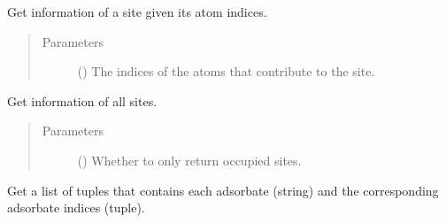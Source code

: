 \documentclass[letterpaper,10pt,english]{sphinxmanual}
\begin{document}
\begin{fulllineitems}
\begin{fulllineitems}
\label{\detokenize{modules:acat.adsorbate_coverage.ClusterAdsorbateCoverage.get_site}}
Get information of a site given its atom indices.
\begin{quote}\begin{description}
\item[{Parameters}] \leavevmode
{} () \textendash{} The indices of the atoms that contribute to the site.

\end{description}\end{quote}

\end{fulllineitems}


\begin{fulllineitems}
\label{\detokenize{modules:acat.adsorbate_coverage.ClusterAdsorbateCoverage.get_sites}}
Get information of all sites.
\begin{quote}\begin{description}
\item[{Parameters}] \leavevmode
{} (\sphinxstyleliteralemphasis{\sphinxupquote{, }}) \textendash{} Whether to only return occupied sites.

\end{description}\end{quote}

\end{fulllineitems}


\begin{fulllineitems}
\label{\detokenize{modules:acat.adsorbate_coverage.ClusterAdsorbateCoverage.get_adsorbates}}
Get a list of tuples that contains each adsorbate (string)
and the corresponding adsorbate indices (tuple).


\end{fulllineitems}
\end{fulllineitems}
\end{document}
